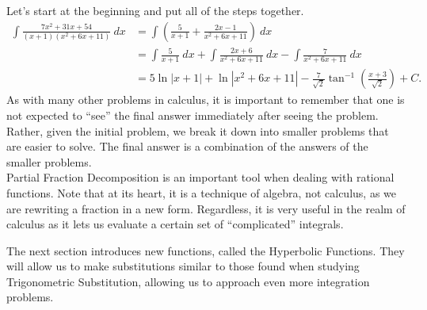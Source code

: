 {Let's start at the beginning and put all of the steps together.
\small\begin{align*}
\int\frac{7x^2+31x+54}{(x+1)(x^2+6x+11)}\ dx &= \int\left(\frac{5}{x+1} + \frac{2x-1}{x^2+6x+11}\right)\ dx \\
			&= \int\frac{5}{x+1}\ dx  + \int\frac{2x+6}{x^2+6x+11}\ dx -\int\frac{7}{x^2+6x+11}\ dx \\
			&= 5\ln|x+1|+ \ln|x^2+6x+11| -\frac{7}{\sqrt{2}}\tan^{-1}\left(\frac{x+3}{\sqrt{2}}\right)+C.
\end{align*}\normalsize
As with many other problems in calculus, it is important to remember that one is not expected to ``see'' the final answer immediately after seeing the problem. Rather, given the initial problem, we break it down into smaller problems that are easier to solve. The final answer is a combination of the answers of the smaller problems.
}\\

Partial Fraction Decomposition is an important tool when dealing with rational functions. Note that at its heart, it is a technique of algebra, not calculus, as we are rewriting a fraction in a new form. Regardless, it is very useful in the realm of calculus as it lets us evaluate a certain set of ``complicated'' integrals.

The next section introduces new functions, called the Hyperbolic Functions. They will allow us to make substitutions similar to those found when studying Trigonometric Substitution, allowing us to approach even more integration problems. 


